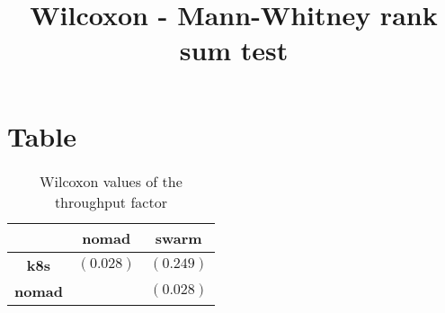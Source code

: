 \documentclass{article}
\title{Wilcoxon - Mann-Whitney rank sum test}
\author{}
\begin{document}
\maketitle
\section{Table}
\begin{table}[!htp]
  \caption{Wilcoxon values of the throughput factor}
  \label{table:throughput}
  \centering
  \begin{scriptsize}
  \begin{tabular}{c|cc}
      & \textbf{nomad} & \textbf{swarm} \\\hline
      \textbf{k8s} & $(0.028) $ & $ (0.249)$ \\
      \textbf{nomad} & $ $ & $ (0.028)$ \\
  \end{tabular}
  \end{scriptsize}
\end{table}
\end{document}
